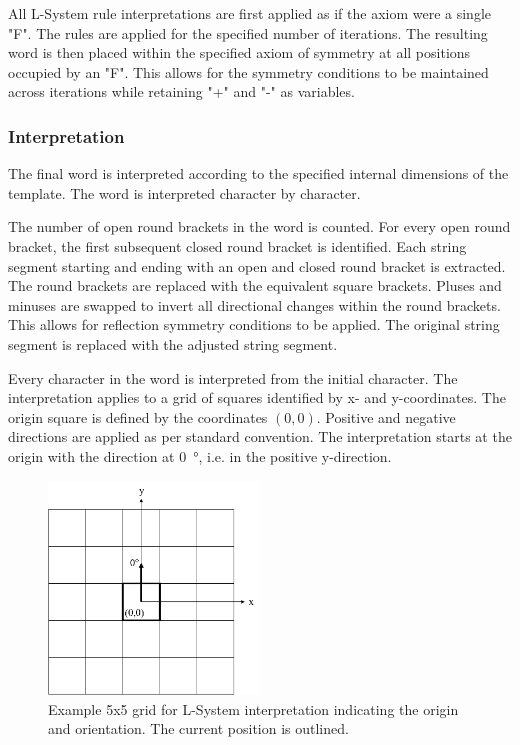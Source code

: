All L-System rule interpretations are first applied as if the axiom were a single "F". The rules are applied for the specified number of iterations. The resulting word is then placed within the specified axiom of symmetry at all positions occupied by an "F". This allows for the symmetry conditions to be maintained across iterations while retaining "+" and "-" as variables.

\subsubsection{Interpretation}

The final word is interpreted according to the specified internal dimensions of the template. The word is interpreted character by character.

The number of open round brackets in the word is counted. For every open round bracket, the first subsequent closed round bracket is identified. Each string segment starting and ending with an open and closed round bracket is extracted. The round brackets are replaced with the equivalent square brackets. Pluses and minuses are swapped to invert all directional changes within the round brackets. This allows for reflection symmetry conditions to be applied. The original string segment is replaced with the adjusted string segment.

Every character in the word is interpreted from the initial character. The interpretation applies to a grid of squares identified by x- and y-coordinates. The origin square is defined by the coordinates $\left (0,0  \right )$. Positive and negative directions are applied as per standard convention. The interpretation starts at the origin with the direction at \SI{0}{\degree}, i.e. in the positive y-direction.

\begin{figure}[H]
	\centering
	\includegraphics[width=0.5\textwidth]{LSOrigin.png}
	\caption[L-System origin and orientation]{Example 5x5 grid for L-System interpretation indicating the origin and orientation. The current position is outlined.}
	\label{fig:lso}
\end{figure}

